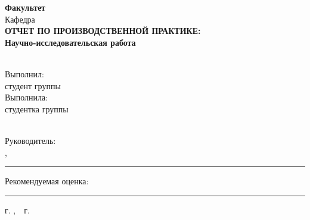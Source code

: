 % 
%

\begin{center}

\begin{minipage}{12cm}
\begin{center}
\textbf{\UniversityFirst} \\[-0.1cm]
\end{center}
\end{minipage}

\textbf{\UniversitySecond} \\[-0.1cm]

\textbf{Факультет \AuthorFaculty} \\[-0.1cm]

Кафедра \AuthorDepartment \\[4.cm]

\large \textbf{ОТЧЕТ ПО ПРОИЗВОДСТВЕННОЙ ПРАКТИКЕ:} \\[0.1cm]

\textbf{Научно-исследовательская работа} \\[0.1cm]

\Title \\[4.cm]
\end{center} 

\hfill
\begin{minipage}{0.4\linewidth}
\begin{flushright}

\ifdefined\male
{
\small Выполнил: \\
студент группы \AuthorGroup \\
}
\else
{
\small Выполнила: \\
студентка группы \AuthorGroup \\
}
\fi

\AuthorSecond\ \AuthorFirst\ \AuthorThird \\
Руководитель: \\
\SupervisorTitles,\ \SupervisorSecond\ \SupervisorInitials \\

\rule{0.5\linewidth}{0.5pt}

Рекомендуемая оценка: \\

\rule{0.5\linewidth}{0.5pt}

\end{flushright}
\end{minipage}

\vfill
\begin{center} 
\small{г. \City,\ \Year\ г.}
\end{center} 

\thispagestyle{empty}
